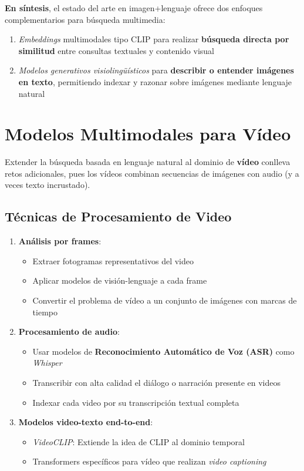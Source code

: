 \textbf{En síntesis}, el estado del arte en imagen+lenguaje ofrece dos enfoques complementarios para búsqueda multimedia:
\begin{enumerate}
  \item \emph{Embeddings} multimodales tipo CLIP para realizar \textbf{búsqueda directa por similitud} entre consultas textuales y contenido visual
  \item \emph{Modelos generativos visiolingüísticos} para \textbf{describir o entender imágenes en texto}, permitiendo indexar y razonar sobre imágenes mediante lenguaje natural
\end{enumerate}

\section{Modelos Multimodales para Vídeo}

Extender la búsqueda basada en lenguaje natural al dominio de \textbf{vídeo} conlleva retos adicionales, pues los vídeos combinan secuencias de imágenes con audio (y a veces texto incrustado).

\subsection{Técnicas de Procesamiento de Video}

\begin{enumerate}
  \item \textbf{Análisis por frames}: 
  \begin{itemize}
    \item Extraer fotogramas representativos del video
    \item Aplicar modelos de visión-lenguaje a cada frame
    \item Convertir el problema de vídeo a un conjunto de imágenes con marcas de tiempo
  \end{itemize}

  \item \textbf{Procesamiento de audio}:
  \begin{itemize}
    \item Usar modelos de \textbf{Reconocimiento Automático de Voz (ASR)} como \emph{Whisper}
    \item Transcribir con alta calidad el diálogo o narración presente en videos
    \item Indexar cada video por su transcripción textual completa
  \end{itemize}

  \item \textbf{Modelos video-texto end-to-end}:
  \begin{itemize}
    \item \emph{VideoCLIP}: Extiende la idea de CLIP al dominio temporal
    \item Transformers específicos para vídeo que realizan \emph{video captioning}
  \end{itemize}
\end{enumerate}


